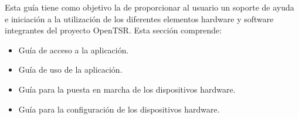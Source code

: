 \documentclass[a4paper,12pt]{article}
\begin{document}
Esta guía tiene como objetivo la de proporcionar al usuario un soporte de ayuda e iniciación a la utilización de los diferentes elementos hardware y software integrantes del proyecto OpenTSR. Esta sección comprende:

\begin{itemize}
\item Guía de acceso a la aplicación.
\item Guía de uso de la aplicación.
\item Guía para la puesta en marcha de los dispositivos hardware.
\item Guía para la configuración de los dispositivos hardware.
\end{itemize}


\clearpage
\nocite{*}


\pagestyle{empty}
\end{document}
